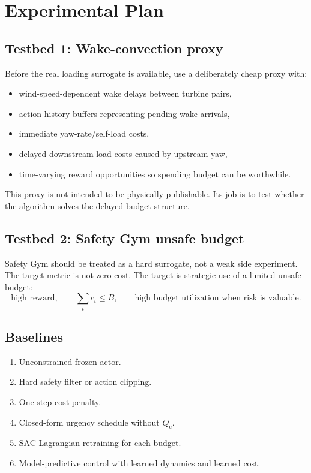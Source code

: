 \documentclass[11pt]{article}
\newcommand{\Qc}{Q_{\mathrm c}}
\begin{document}
\section{Experimental Plan}

\subsection{Testbed 1: Wake-convection proxy}

Before the real loading surrogate is available, use a deliberately cheap proxy with:
\begin{itemize}
  \item wind-speed-dependent wake delays between turbine pairs,
  \item action history buffers representing pending wake arrivals,
  \item immediate yaw-rate/self-load costs,
  \item delayed downstream load costs caused by upstream yaw,
  \item time-varying reward opportunities so spending budget can be worthwhile.
\end{itemize}

This proxy is not intended to be physically publishable.
Its job is to test whether the algorithm solves the delayed-budget structure.

\subsection{Testbed 2: Safety Gym unsafe budget}

Safety Gym should be treated as a hard surrogate, not a weak side experiment.
The target metric is not zero cost.
The target is strategic use of a limited unsafe budget:
\begin{equation}
  \text{high reward}, \qquad \sum_t c_t \le B, \qquad \text{high budget utilization when risk is valuable.}
\end{equation}

\subsection{Baselines}

\begin{enumerate}
  \item Unconstrained frozen actor.
  \item Hard safety filter or action clipping.
  \item One-step cost penalty.
  \item Closed-form urgency schedule without $\Qc$.
  \item SAC-Lagrangian retraining for each budget.
  \item Model-predictive control with learned dynamics and learned cost.
\end{enumerate}
\end{document}
